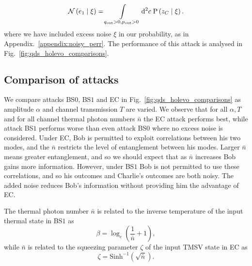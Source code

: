 \begin{equation}
\mathcal{N}\left(e_1 \; \middle| \; \xi\right) = \int\limits_{q_{\text{out}}>0, p_{\text{out}}>0} \mathop{}\!\mathrm{d^2} c \; \text{P}\left(z_C \; \middle| \; \xi \right).
\end{equation}
where we have included excess noise $\xi$ in our probability, as in Appendix.~\ref{appendix:noisy_perr}. The performance of this attack is analysed in Fig.~\ref{fig:qds_holevo_comparisons}.


\subsection{Comparison of attacks}

We compare attacks BS$0$, BS$1$ and EC in Fig.~\ref{fig:qds_holevo_comparisons} as amplitude $\alpha$ and channel transmission $T$ are varied. We observe that for all $\alpha, T$ and for all channel thermal photon numbers $\bar{n}$ the EC attack performs best, while attack BS$1$ performs worse than even attack BS$0$ where no excess noise is considered. Under EC, Bob is permitted to exploit correlations between his two modes, and the $\bar{n}$ restricts the level of entanglement between his modes. Larger $\bar{n}$ means greater entanglement, and so we should expect that as $\bar{n}$ increases Bob gains more information. However, under BS$1$ Bob is not permitted to use these correlations, and so his outcomes and Charlie's outcomes are both noisy. The added noise reduces Bob's information without providing him the advantage of EC. 

The thermal photon number $\bar{n}$ is related to the inverse temperature of the input thermal state in BS$1$ as \cite{Leonhardt2010}
\begin{equation}
\beta = \log_e\left(\frac{1}{\bar{n}} + 1\right),
\end{equation}
while $\bar{n}$ is related to the squeezing parameter $\zeta$ of the input TMSV state in EC as \cite{Leonhardt2010}
\begin{equation}
\zeta = \text{Sinh}^{-1}\left(\sqrt{\bar{n}}\right).
\end{equation}

